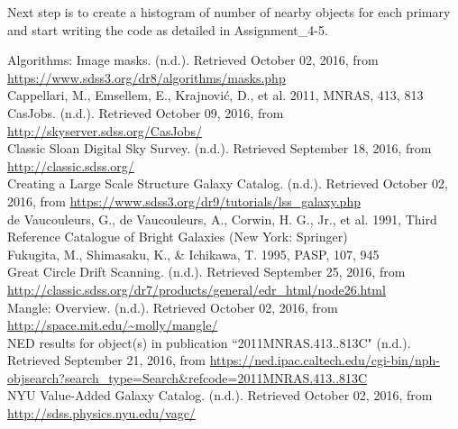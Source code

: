 \documentclass[10pt,letterpaper]{article}
\begin{document}
Next step is to create a histogram of number of nearby objects for each primary and start writing the code as detailed in Assignment\_4-5.

\newpage
\center
\begin{thebibliography}{1}
 Algorithms: Image masks. (n.d.). Retrieved October 02, 2016, from \url{https://www.sdss3.org/dr8/algorithms/masks.php}\\

 Cappellari, M., Emsellem, E., Krajnovi\'c, D., et al. 2011, MNRAS, 413, 813\\

CasJobs. (n.d.). Retrieved October 09, 2016, from \url{http://skyserver.sdss.org/CasJobs/}\\


 Classic Sloan Digital Sky Survey. (n.d.). Retrieved September 18, 2016, from \url{http://classic.sdss.org/}\\

 Creating a Large Scale Structure Galaxy Catalog. (n.d.). Retrieved October 02, 2016, from \url{https://www.sdss3.org/dr9/tutorials/lss_galaxy.php}\\

 de Vaucouleurs, G., de Vaucouleurs, A., Corwin, H. G., Jr., et al. 1991, Third
Reference Catalogue of Bright Galaxies (New York: Springer)\\

 Fukugita, M., Shimasaku, K., \& Ichikawa, T. 1995, PASP, 107, 945\\

 Great Circle Drift Scanning. (n.d.). Retrieved September 25, 2016, from \url{http://classic.sdss.org/dr7/products/general/edr_html/node26.html}\\

 Mangle: Overview. (n.d.). Retrieved October 02, 2016, from \url{http://space.mit.edu/~molly/mangle/}\\

 NED results for object(s) in publication ``2011MNRAS.413..813C" (n.d.). Retrieved September 21, 2016, from \url{https://ned.ipac.caltech.edu/cgi-bin/nph-objsearch?search_type=Search&refcode=2011MNRAS.413..813C}\\

 NYU Value-Added Galaxy Catalog. (n.d.). Retrieved October 02, 2016, from \url{http://sdss.physics.nyu.edu/vagc/}\\


\end{thebibliography}
\end{document}
